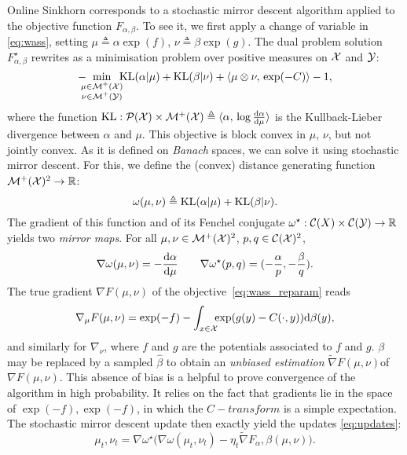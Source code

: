 Online Sinkhorn corresponds to a stochastic mirror descent algorithm applied to
the objective function $F_{\alpha, \beta}$. To see it, we first apply a change
of variable in \eqref{eq:wass}, setting $\mu \triangleq \alpha \exp(f)$, $\nu
\triangleq \beta \exp(g)$. The dual problem solution $F_{\alpha, \beta}^\star$
rewrites as a minimisation problem over positive measures on $\mathcal{X}$ and $\mathcal{Y}$:
\begin{equation}\label{eq:wass_reparam}
    - \!\!\!\!\min_{\substack{\mu \in \mathcal{M}^+(\mathcal{X}) \\ 
    \nu \in \mathcal{M}^+(\mathcal{Y})}} \!\!\!\textrm{KL}(\alpha | \mu)
    + \textrm{KL}(\beta | \nu) + \langle \mu \otimes \nu,\,\exp(-C)\rangle - 1,
\end{equation}
where the function $\textrm{KL}: \mathcal{P}(\mathcal{X}) \times \mathcal{M}^+(\mathcal{X}) \triangleq \langle \alpha,\,
    \log \frac{\textrm{d} \alpha}{\textrm{d} \mu}\rangle$ is the Kullback-Lieber divergence between
$\alpha$ and $\mu$. This objective is block convex in $\mu$, $\nu$, but not jointly convex. As it is defined on \textit{Banach} spaces, we can solve it using stochastic mirror descent. For this, we define the (convex) distance generating function $\mathcal{M}^+(\mathcal{X})^2 \to \mathbb{R}$:
\begin{equation}
    \omega(\mu, \nu) \triangleq \textrm{KL}(\alpha | \mu) + \textrm{KL}(\beta | \nu).
\end{equation}
The gradient of this function and of its Fenchel conjugate $\omega^\star: \mathcal{C}(X)
\times \mathcal{C}(\mathcal{Y}) \to \mathbb{R}$ yields two \textit{mirror maps}. For all $\mu, \nu \in
\mathcal{M}^+(\mathcal{X})^2$, $p, q \in \mathcal{C}(\mathcal{X})^2$,
\begin{equation}
    \nabla \omega(\mu, \nu) = - \frac{\textrm{d} \alpha}{\textrm{d} \mu}
    \qquad \nabla \omega^\star(p, q) = (-\frac{\alpha}{p}, -\frac{\beta}{q}).
\end{equation}
The true gradient $\nabla F(\mu, \nu)$ of the objective~\eqref{eq:wass_reparam} reads
\begin{equation}
    \nabla_\mu F(\mu, \nu) = \exp(-f) - 
    \int_{x \in \mathcal{X}} \!\!\! \exp(g(y) - C(\cdot, y))\textrm{d} \beta(y),
\end{equation}
and similarly for $\nabla_\nu$, where $f$ and $g$ are the potentials associated
to $f$ and $g$. $\beta$ may be replaced by a sampled $\hat \beta$ to obtain an
\textit{unbiased estimation} $\tilde \nabla F(\mu, \nu)$of $\nabla F(\mu, \nu)$.
This absence of bias is a helpful to prove convergence of the algorithm in high
probability. It relies on the fact that gradients lie in the space of $\exp(-f),
\exp(-f)$, in which the $C-transform$ is a simple expectation. The stochastic
mirror descent update then exactly yield the updates \eqref{eq:updates}:
% 
\begin{equation}
    \mu_t, \nu_t = \nabla \omega^\star\Big( \nabla \omega(\mu_t, \nu_t) - 
    \eta_t \tilde \nabla F_\alpha, \beta(\mu, \nu)\Big).
\end{equation}

